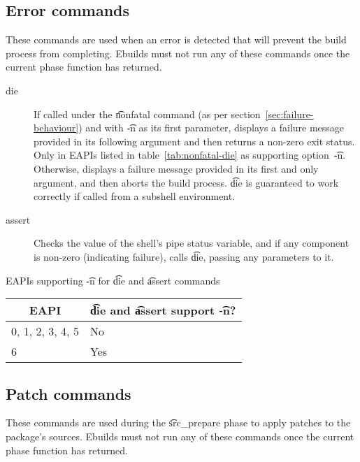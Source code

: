 \subsection{Error commands}
These commands are used when an error is detected that will prevent the build process from
completing. Ebuilds must not run any of these commands once the current phase function has returned.
\begin{description}
\item[die]  If called under the \t{nonfatal} command (as per
    section~\ref{sec:failure-behaviour}) and with \t{-n} as its first parameter, displays a failure
    message provided in its following argument and then returns a non-zero exit status. Only in
    EAPIs listed in table~\ref{tab:nonfatal-die} as supporting option~\t{-n}. Otherwise, displays
    a failure message provided in its first and only argument, and then aborts the build process.
    \t{die} is  guaranteed to work correctly if called from a subshell environment.
\item[assert] Checks the value of the shell's pipe status variable, and if any component is non-zero
    (indicating failure), calls \t{die}, passing any parameters to it.
\end{description}

\begin{centertable}{EAPIs supporting \t{-n} for \t{die} and \t{assert} commands}
    \label{tab:nonfatal-die}
    \begin{tabular}{ll}
      \toprule
      \multicolumn{1}{c}{\textbf{EAPI}} &
      \multicolumn{1}{c}{\textbf{\t{die} and \t{assert} support \t{-n}?}} \\
      \midrule
      0, 1, 2, 3, 4, 5  & No  \\
      6                 & Yes \\
      \bottomrule
    \end{tabular}
\end{centertable}

\subsection{Patch commands}
These commands are used during the \t{src_prepare} phase to apply patches to the package's sources.
Ebuilds must not run any of these commands once the current phase function has returned.


